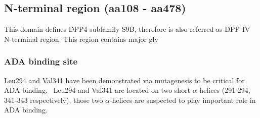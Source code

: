 \subsection{N-terminal region (aa108 - aa478)}

This domain defines DPP4 subfamily S9B, therefore is also referred as DPP IV N-terminal region. This region contains major gly

\subsubsection{ADA binding site}
Leu294 and Val341 have been demonstrated via mutagenesis to be critical for ADA binding.~\cite{Abbott_1999} Leu294 and Val341 are located on two short $\alpha$-helices (291-294, 341-343 respectively), those two $\alpha$-helices are suspected to play important role in ADA binding. 